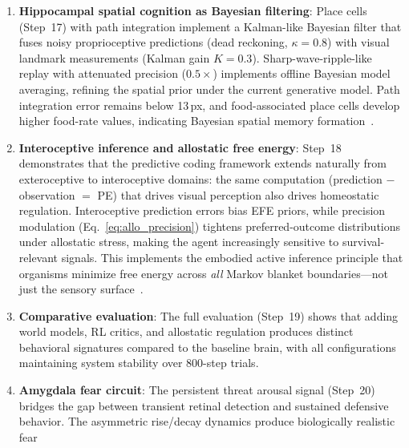 \documentclass[11pt,a4paper]{article}
\begin{document}
\begin{enumerate}[nosep]
    minimizing variational free energy, unifying perception (encoder),
    generation (decoder), and prediction (transition model) under a
    single information-theoretic objective.
    The information bottleneck interpretation of the KL term ensures that
    latent beliefs retain only task-relevant information, implementing
    efficient Bayesian compression of high-dimensional sensory
    streams~\cite{tishby2000}.
  \item \textbf{Hippocampal spatial cognition as Bayesian filtering}:
    Place cells (Step~17) with path integration implement a Kalman-like
    Bayesian filter that fuses noisy proprioceptive predictions
    (dead reckoning, $\kappa = 0.8$) with visual landmark measurements
    (Kalman gain $K = 0.3$).
    Sharp-wave-ripple-like replay with attenuated precision ($0.5\times$)
    implements offline Bayesian model averaging, refining the spatial
    prior under the current generative model.
    Path integration error remains below 13\,px, and food-associated place
    cells develop higher food-rate values, indicating Bayesian spatial
    memory formation~\cite{mcnaughton2006}.
  \item \textbf{Interoceptive inference and allostatic free energy}:
    Step~18 demonstrates that the predictive coding framework
    extends naturally from exteroceptive to interoceptive domains:
    the same computation (prediction $-$ observation $=$ PE) that drives
    visual perception also drives homeostatic regulation.
    Interoceptive prediction errors bias EFE priors, while precision
    modulation (Eq.~\ref{eq:allo_precision}) tightens preferred-outcome
    distributions under allostatic stress, making the agent increasingly
    sensitive to survival-relevant signals.
    This implements the embodied active inference principle that
    organisms minimize free energy across \emph{all} Markov blanket
    boundaries---not just the sensory
    surface~\cite{seth2016,stephan2016,pezzulo2015}.
  \item \textbf{Comparative evaluation}: The full evaluation (Step~19) shows
    that adding world models, RL critics, and allostatic regulation
    produces distinct behavioral signatures compared to the baseline brain,
    with all configurations maintaining system stability over 800-step trials.
  \item \textbf{Amygdala fear circuit}: The persistent threat arousal
    signal (Step~20) bridges the gap between transient retinal detection and
    sustained defensive behavior.
    The asymmetric rise/decay dynamics produce biologically realistic fear

\end{enumerate}
\end{document}
